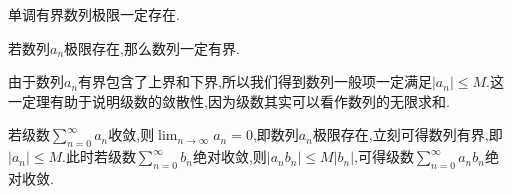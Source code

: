\begin{ttheorem}[（单调有界定理）]
    单调有界数列极限一定存在.
\end{ttheorem}

\begin{ttheorem}
    若数列${a_n}$极限存在,那么数列一定有界.
\end{ttheorem}
由于数列${a_n}$有界包含了上界和下界,所以我们得到数列一般项一定满足$\left\lvert a_n\right\rvert  \leqslant M$.这一定理有助于说明级数的敛散性,因为级数其实可以看作数列的无限求和.

若级数$\sum_{n=0}^{\infty} a_n$收敛,则$\lim_{n \to \infty} a_n=0$,即数列${a_n}$极限存在,立刻可得数列有界,即$\left\lvert a_n\right\rvert  \leqslant M$.此时若级数$\sum_{n=0}^{\infty} b_n$绝对收敛,则$\left\lvert a_nb_n\right\rvert \leqslant M\left\lvert b_n\right\rvert $,可得级数$\sum_{n=0}^{\infty} a_nb_n$绝对收敛.

